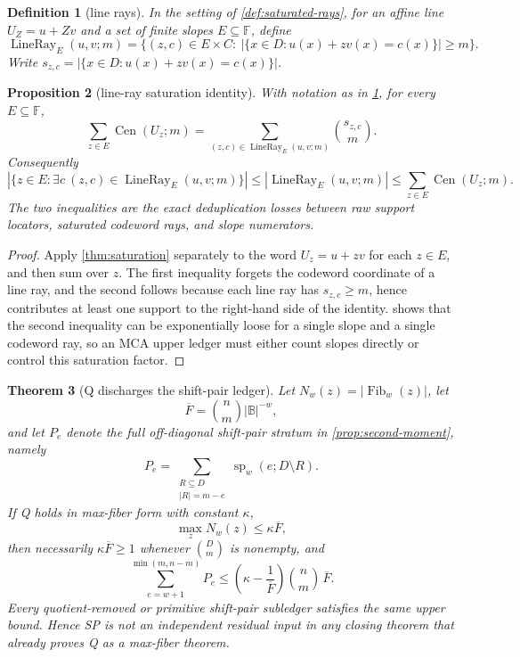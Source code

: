\documentclass[a4paper,11pt]{amsart}
\newtheorem{theorem}{Theorem}[section]
\newtheorem{proposition}[theorem]{Proposition}
\newtheorem{definition}[theorem]{Definition}
\theoremstyle{remark}
\newcommand{\F}{\mathbb F}
\newcommand{\B}{\mathbb B}
\newcommand{\Fib}{\operatorname{Fib}}
\newcommand{\Cen}{\operatorname{Cen}}
\newcommand{\LineRay}{\operatorname{LineRay}}
\begin{document}
\begin{definition}[line rays]\label{def:line-rays}
In the setting of \cref{def:saturated-rays}, for an affine line \(U_Z=u+Zv\) and a set of finite slopes \(E\subseteq\F\), define
\[
        \LineRay_E(u,v;m)
        =
        \{(z,c)\in E\times C:\ |\{x\in D:u(x)+zv(x)=c(x)\}|\ge m\}.
\]
Write \(s_{z,c}=|\{x\in D:u(x)+zv(x)=c(x)\}|\).
\end{definition}

\begin{proposition}[line-ray saturation identity]\label{prop:line-ray-saturation}
With notation as in \cref{def:line-rays}, for every \(E\subseteq\F\),
\[
        \sum_{z\in E}\Cen(U_z;m)
        =
        \sum_{(z,c)\in\LineRay_E(u,v;m)}\binom{s_{z,c}}m .
\]
Consequently
\[
        |\{z\in E:\exists c\ (z,c)\in\LineRay_E(u,v;m)\}|
        \le
        |\LineRay_E(u,v;m)|
        \le
        \sum_{z\in E}\Cen(U_z;m).
\]
The two inequalities are the exact deduplication losses between raw support locators, saturated codeword rays, and slope numerators.
\end{proposition}

\begin{proof}
Apply \cref{thm:saturation} separately to the word \(U_z=u+zv\) for each \(z\in E\), and then sum over \(z\).  The first inequality forgets the codeword coordinate of a line ray, and the second follows because each line ray has \(s_{z,c}\ge m\), hence contributes at least one support to the right-hand side of the identity.   shows that the second inequality can be exponentially loose for a single slope and a single codeword ray, so an MCA upper ledger must either count slopes directly or control this saturation factor.
\end{proof}

\begin{theorem}[Q discharges the shift-pair ledger]\label{thm:q-implies-sp}
Let \(N_w(z)=|\Fib_w(z)|\), let
\[
        \overline F=\binom nm |\B|^{-w},
\]
and let \(P_e\) denote the full off-diagonal shift-pair stratum in \cref{prop:second-moment}, namely
\[
        P_e=\sum_{\substack{R\subseteq D\\ |R|=m-e}}\operatorname{sp}_w(e;D\setminus R).
\]
If Q holds in max-fiber form with constant \(\kappa\),
\[
        \max_z N_w(z)\le \kappa\overline F,
\]
then necessarily \(\kappa\overline F\ge1\) whenever \(\binom Dm\) is nonempty, and
\[
        \sum_{e=w+1}^{\min(m,n-m)}P_e
        \le
        \left(\kappa-\frac{1}{\overline F}\right)\binom nm\,\overline F .
\]
Every quotient-removed or primitive shift-pair subledger satisfies the same upper bound.  Hence SP is not an independent residual input in any closing theorem that already proves Q as a max-fiber theorem.
\end{theorem}
\end{document}
